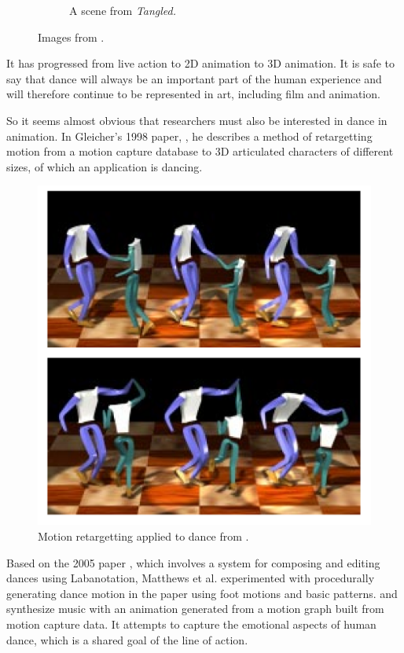 \begin{figure}[h!]
\begin{subfigure}[b!]{0.3\textwidth}
                \label{fig:tangled}
                \caption{A scene from \textit{Tangled.}}
        \end{subfigure}%
        \caption{Images from \protect{}.}
	\label{fig:danceinmovies}
\end{figure}

It has progressed from live action to 2D animation to 3D animation. It is safe to say that dance will always be an important part of the human experience and will therefore continue to be represented in art, including film and animation.

So it seems almost obvious that researchers must also be interested in dance in animation. In Gleicher's 1998 paper, \citep{gleicher1998retargetting}, he describes a method of retargetting motion from a motion capture database to 3D articulated characters of different sizes, of which an application is dancing.

\begin{figure}[!h]
\centering
\includegraphics[scale=0.5]{img/retarget}
\caption{Motion retargetting applied to dance from \citep{gleicher1998retargetting}.}
\end{figure}

Based on the 2005 paper \citep{calvert2005applications}, which involves a system for composing and editing dances using Labanotation, Matthews et al. experimented with procedurally generating dance motion in the paper \citep{matthews2011procedural} using foot motions and basic patterns. \citep{shiratori2006dancing} and \citep{shiratori2006synthesizing} synthesize music with an animation generated from a motion graph built from motion capture data. It attempts to capture the emotional aspects of human dance, which is a shared goal of the line of action.
